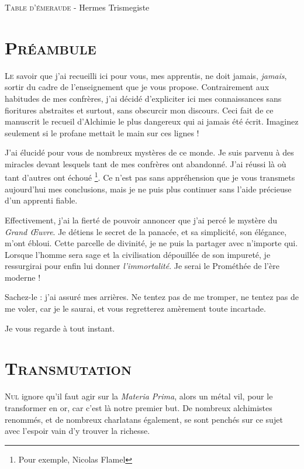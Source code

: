 \textsc{Table d'émeraude} - Hermes Trismegiste

\newpage

\section{\textsc{Préambule}}

\lettrine{L}{e} savoir que j'ai recueilli ici pour vous, mes apprentis, ne doit jamais,
\emph{jamais}, sortir du cadre de l'enseignement que je vous propose.
Contrairement aux habitudes de mes confrères, j'ai décidé d'expliciter ici mes
connaissances sans fioritures abstraites et surtout, sans obscurcir mon
discours. Ceci fait de ce manuscrit le recueil d'Alchimie le plus dangereux qui
ai jamais été écrit. Imaginez seulement si le profane mettait le main sur ces
lignes !

J'ai élucidé pour vous de nombreux mystères de ce monde. Je suis parvenu à des
miracles devant lesquels tant de mes confrères ont abandonné. J'ai réussi là où
tant d'autres ont échoué \footnote{Pour exemple, Nicolas Flamel}. Ce n'est pas
sans appréhension que je vous transmets aujourd'hui mes conclusions, mais je ne puis
plus continuer sans l'aide précieuse d'un apprenti fiable.

Effectivement, j'ai la fierté de pouvoir annoncer que j'ai percé le mystère du
\emph{Grand Œuvre}. Je détiens le secret de la panacée, et sa simplicité, son
élégance, m'ont ébloui. Cette parcelle de divinité, je ne puis la partager avec
n'importe qui. Lorsque l'homme sera sage et la civilisation dépouillée de son
impureté, je ressurgirai pour enfin lui donner \emph{l'immortalité}. Je serai
le Prométhée de l'ère moderne !

Sachez-le : j'ai assuré mes arrières. Ne tentez pas de me tromper, ne tentez
pas de me voler, car je le saurai, et vous regretterez amèrement toute
incartade.

Je vous regarde à tout instant.

\section{\textsc{Transmutation}}

\lettrine{N}{ul} ignore qu'il faut agir sur la \emph{Materia Prima}, alors un métal vil,
pour le transformer en or, car c'est là notre premier but. De nombreux
alchimistes renommés, et de nombreux charlatans également, se sont penchés sur
ce sujet avec l'espoir vain d'y trouver la richesse.


